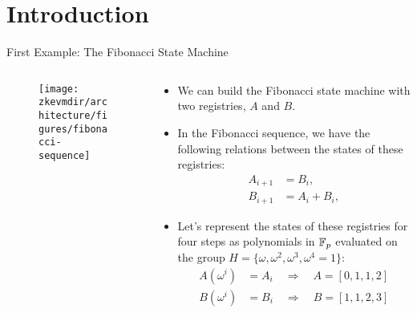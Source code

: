 
\section{Introduction}

\begin{frame}[allowframebreaks]{First Example: The Fibonacci State Machine}

\begin{columns}
\begin{column}{0.3\textwidth}
\begin{figure}
	\texttt{[image: \\zkevmdir/architecture/figures/fibonacci-sequence]}
\end{figure}
\end{column}
\begin{column}{0.7\textwidth}
\begin{itemize}
\item We can build the Fibonacci state machine with two registries, $A$ and $B$.
\item In the Fibonacci sequence, we have the following relations between the states of these registries:
\begin{align*}
A_{i+1} &= B_i, \\
B_{i+1} &= A_i + B_i,
\end{align*}

\item Let's represent the states of these registries for four steps as polynomials in $\mathbb{F}_p$ evaluated 
on the group $H = \{\omega, \omega^2, \omega^3, \omega^4 = 1\}$:
\begin{align*}
A(\omega^i) &= A_i \quad \Longrightarrow \quad A = [0, 1, 1, 2] \\
B(\omega^i) &= B_i \quad \Longrightarrow \quad B = [1, 1, 2, 3]
\end{align*}
\end{itemize}
\end{column}
\end{columns}



\end{frame}
